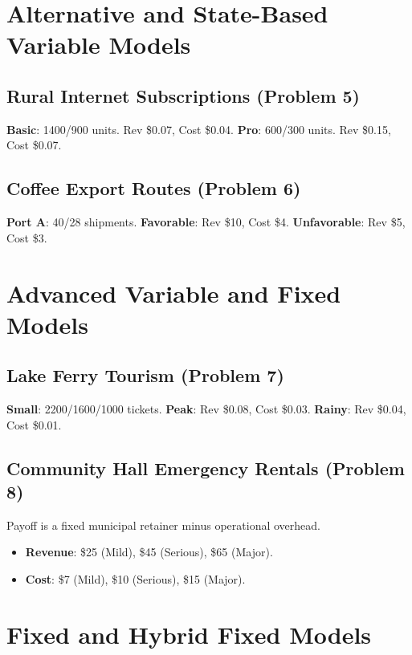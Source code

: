 	\section{Alternative and State-Based Variable Models}
	
	\subsection{Rural Internet Subscriptions (Problem 5)}
	\textbf{Basic}: 1400/900 units. Rev \$0.07, Cost \$0.04. \textbf{Pro}: 600/300 units. Rev \$0.15, Cost \$0.07.
	
	\subsection{Coffee Export Routes (Problem 6)}
	\textbf{Port A}: 40/28 shipments. \textbf{Favorable}: Rev \$10, Cost \$4. \textbf{Unfavorable}: Rev \$5, Cost \$3.
	
	\section{Advanced Variable and Fixed Models}
	
	\subsection{Lake Ferry Tourism (Problem 7)}
	\textbf{Small}: 2200/1600/1000 tickets. \textbf{Peak}: Rev \$0.08, Cost \$0.03. \textbf{Rainy}: Rev \$0.04, Cost \$0.01.
	
	\subsection{Community Hall Emergency Rentals (Problem 8)}
	Payoff is a fixed municipal retainer minus operational overhead.
	\begin{itemize}
		\item \textbf{Revenue}: \$25 (Mild), \$45 (Serious), \$65 (Major).
		\item \textbf{Cost}: \$7 (Mild), \$10 (Serious), \$15 (Major).
	\end{itemize}
	
	\section{Fixed and Hybrid Fixed Models}
	
